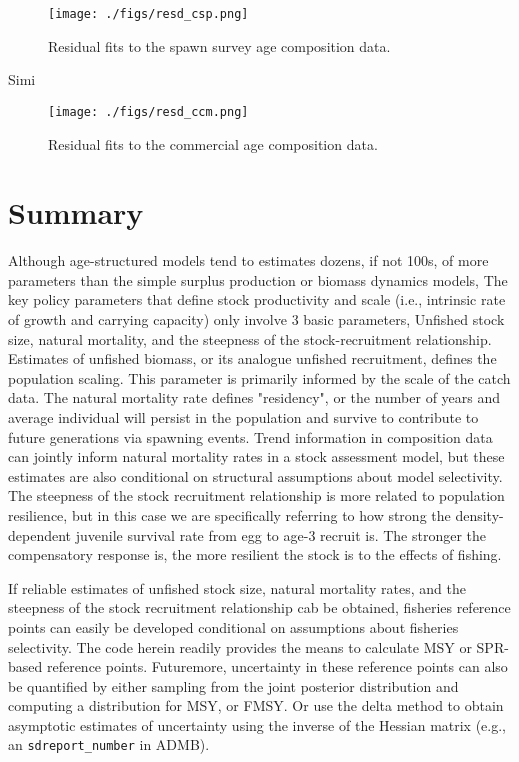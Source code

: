 \documentclass[12pt,letterpaper]{article}
\begin{document}
  \begin{figure}[tb]
    \centering
    \texttt{[image: ./figs/resd\_csp.png]}
    \caption{Residual fits to the spawn survey age composition data.}
    \label{fig:resd_csp}
  \end{figure}

  Simi

  \begin{figure}[tb]
    \centering
    \texttt{[image: ./figs/resd\_ccm.png]}
    \caption{Residual fits to the commercial age composition data.}
    \label{fig:resd_ccm}
  \end{figure}

  
  \clearpage


  \section{Summary} %

  Although age-structured models tend to estimates dozens, if not 100s, of more parameters than the simple surplus production or biomass dynamics models, The key policy parameters that define stock productivity and scale (i.e., intrinsic rate of growth and carrying capacity) only involve 3 basic parameters, Unfished stock size, natural mortality, and the steepness of the stock-recruitment relationship.  Estimates of unfished biomass, or its analogue unfished recruitment, defines the population scaling. This parameter is primarily informed by the scale of the catch data.  The natural mortality rate defines "residency", or the number of years and average individual will persist in the population and survive to contribute to future generations via spawning events.  Trend information in composition data can jointly inform natural mortality rates in a stock assessment model, but these estimates are also conditional on structural assumptions about model selectivity.  The steepness of the stock recruitment relationship is more related to population resilience, but in this case we are specifically referring to how strong the density-dependent juvenile survival rate from egg to age-3 recruit is. The stronger the compensatory response is, the more resilient the stock is to the effects of fishing.

  If reliable estimates of unfished stock size,  natural mortality rates, and the steepness of the stock recruitment relationship cab be obtained, fisheries reference points can easily be developed conditional on assumptions about fisheries selectivity. The code herein readily provides the means to calculate MSY or SPR-based reference points.  Futuremore, uncertainty in these reference points can also be quantified by either sampling from the joint posterior distribution and computing a distribution for MSY, or FMSY.  Or use the delta method to obtain asymptotic estimates of uncertainty using the inverse of the Hessian matrix (e.g., an \texttt{sdreport\_number} in ADMB).
\end{document}

